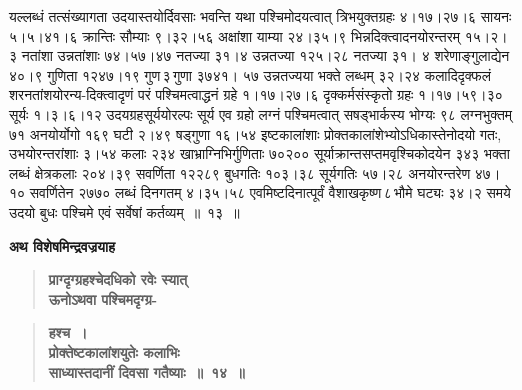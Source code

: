 \documentclass[11pt, openany]{book}
\begin{document}
\begin{sloppypar}
\noindent यल्लब्धं तत्संख्यागता उदयास्तयोर्दिवसाः भवन्ति यथा पश्चिमोदयत्वात् त्रिभयुक्तग्रहः ४।१७।२७।६ सायनः ५।५।४१।६ क्रान्तिः सौम्याः ९।३२।५६ अक्षांशा याम्या २४।३५।९ भिन्नदिक्त्वादनयोरन्तरम् १५।२।३ नतांशा उन्नतांशाः ७४।५७।४७ नतज्या ३१।४ उन्नतज्या १२५।२८ नतज्या ३१। ४ शरेणाङ्गुलाद्येन ४०।९ गुणिता १२४७।१९ गुण\textendash \,३\textendash \,गुणा ३७४१। ५७ उन्नतज्यया भक्ते लब्धम् ३२।२४ कलादिदृक्फलं शरनतांशयोरन्य-दिक्त्वादृणं परं पश्चिमत्वाद्धनं ग्रहे १।१७।२७।६ दृक्कर्मसंस्कृतो ग्रहः १।१७।५९।३० सूर्यः १।३।६।१२ उदयग्रहसूर्ययोरल्पः सूर्य एव ग्रहो लग्नं पश्चिमत्वात् सषड्भार्कस्य भोग्यः ९८ लग्नभुक्तम् ७१ अनयोर्योगो १६९ घटी २।४९ षड्गुणा १६।५४ इष्टकालांशाः प्रोक्तकालांशेभ्योऽधिकास्तेनोदयो गतः, उभयोरन्तरांशाः ३।५४ कलाः २३४ खाभ्राग्निभिर्गुणिताः ७०२०० सूर्याक्रान्तसप्तमवृश्चिकोदयेन ३४३ भक्ता लब्धं क्षेत्रकलाः २०४।३९ सवर्णिता १२२८९ बुधगतिः १०३।३८ सूर्यगतिः ५७।२८ अनयोरन्तरेण ४७।१० सवर्णितेन २७७० लब्धं दिनगतम् ४।३५।५८ एवमिष्टदिनात्पूर्वं वैशाखकृष्ण\textendash \,८\textendash \,भौमे घट्यः ३४।२ समये उदयो बुधः पश्चिमे एवं सर्वेषां कर्तव्यम्~॥~१३~॥\\
\end{sloppypar}

{\small \textbf{अथ विशेषमिन्द्रवज्रयाह\textendash }}

 \label{6.14.1}
\begin{quote}
{\large \textbf{{\color{purple}प्राग्दृग्ग्रहश्चेदधिको रवेः स्यात् \\ ऊनोऽथवा पश्चिमदृग्ग्र-}}}
\end{quote}

\newpage

 \label{6.14}
\begin{quote}
{\large \textbf{{\color{purple}हश्च~। \\
प्रोक्तेष्टकालांशयुतेः कलाभिः \\
साध्यास्तदानीं दिवसा गतैष्याः~॥~१४~॥}}}
\end{quote}
\end{document}
